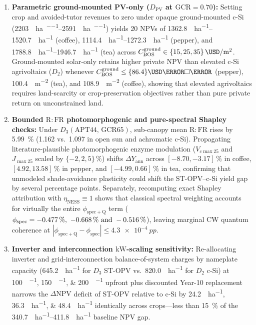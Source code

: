 \documentclass[preprint,12pt,a4paper]{elsarticle}
\begin{document}
\begin{enumerate}
 \item \textbf{Parametric ground-mounted PV-only ($D_{\mathrm{PV}}$ at $\mathrm{GCR}=\num{0.70}$):} Setting crop and avoided-tutor revenues to zero under opaque ground-mounted c-Si (\qtyrange{2203}{2591}{\MWh\per\hectare\per\yr}) yields \qty{20}{\yr} NPVs of \qtyrange{1362.8}{1520.7}{\kUSD\per\hectare} (coffee), \qtyrange{1114.4}{1272.3}{\kUSD\per\hectare} (pepper), and \qtyrange{1788.8}{1946.7}{\kUSD\per\hectare} (tea) across $C_{\mathrm{BOS}}^{\mathrm{ground}} \in \{\num{15}, \num{25}, \num{35}\}\,\unit{\USD\per\square\meter}$. Ground-mounted solar-only retains higher private NPV than elevated c-Si agrivoltaics ($D_2$) whenever $C_{\mathrm{BOS}}^{\mathrm{ground}} \le \qty{86.4}{\USD\per\square\meter}$ (pepper), \qty{100.4}{\USD\per\square\meter} (tea), and \qty{108.9}{\USD\per\square\meter} (coffee), showing that elevated agrivoltaics requires land-scarcity or crop-preservation objectives rather than pure private return on unconstrained land.
 \item \textbf{Bounded $\mathrm{R{:}FR}$ photomorphogenic and pure-spectral Shapley checks:} Under $D_3(\mathrm{APT44,\,GCR65})$, sub-canopy mean $\mathrm{R{:}FR}$ rises by \qty{+5.99}{\percent} (\num{1.162} vs.\ \num{1.097} in open sun and achromatic c-Si). Propagating literature-plausible photomorphogenic enzyme modulation ($V_{c\max 25}$ and $J_{\max 25}$ scaled by $\{\num{-2}, \num{+2}, \num{+5}\}\,\unit{\percent}$) shifts $\Delta Y_{\mathrm{ann}}$ across $[\num{-8.70}, \num{-3.17}]\,\unit{\percent}$ in coffee, $[\num{+4.92}, \num{+13.58}]\,\unit{\percent}$ in pepper, and $[\num{-4.99}, \num{+0.66}]\,\unit{\percent}$ in tea, confirming that unmodeled shade-avoidance plasticity could shift the ST-OPV--c-Si yield gap by several percentage points. Separately, recomputing exact Shapley attribution with $\eta_{\mathrm{NESS}} \equiv 1$ shows that classical spectral weighting accounts for virtually the entire $\phi_{\mathrm{spec+Q}}$ term ($\phi_{\mathrm{spec}} = \qtylist{-0.477;-0.668;-0.516}{\percent}$), leaving marginal CW quantum coherence at $|\phi_{\mathrm{spec+Q}} - \phi_{\mathrm{spec}}| \le \qty{4.3e-4}{pp}$.
 \item \textbf{Inverter and interconnection $\mathrm{kW}$-scaling sensitivity:} Re-allocating inverter and grid-interconnection balance-of-system charges by nameplate capacity (\qty{645.2}{\kWp\per\hectare} for $D_3$ ST-OPV vs.\ \qty{820.0}{\kWp\per\hectare} for $D_2$ c-Si) at \qtylist{100;150;200}{\USD\per\kWp} upfront plus discounted Year-10 replacement narrows the $\Delta\mathrm{NPV}$ deficit of ST-OPV relative to c-Si by \qtylist{24.2;36.3;48.4}{\kUSD\per\hectare} identically across crops---less than \qty{15}{\percent} of the \qtyrange{340.7}{411.8}{\kUSD\per\hectare} baseline NPV gap.
\end{enumerate}
\end{document}
